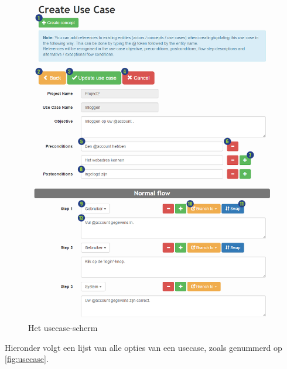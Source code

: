 \documentclass[a4paper,11pt]{article}
\begin{document}
\begin{figure}[H]
\centering
\includegraphics[scale=0.5]{Gebruikershandleiding_img/usecase.png}
\caption{Het usecase-scherm}
\label{fig:usecase}
\end{figure}

Hieronder volgt een lijst van alle opties van een usecase, zoals genummerd op \autoref{fig:usecase}.\linebreak
\end{document}
